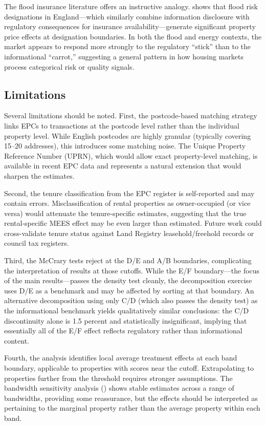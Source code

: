 \documentclass[12pt]{article}
\begin{document}
The flood insurance literature offers an instructive analogy. \citet{surminski2017flood} shows that flood risk designations in England---which similarly combine information disclosure with regulatory consequences for insurance availability---generate significant property price effects at designation boundaries. In both the flood and energy contexts, the market appears to respond more strongly to the regulatory ``stick'' than to the informational ``carrot,'' suggesting a general pattern in how housing markets process categorical risk or quality signals.

\subsection{Limitations}

Several limitations should be noted. First, the postcode-based matching strategy links EPCs to transactions at the postcode level rather than the individual property level. While English postcodes are highly granular (typically covering 15--20 addresses), this introduces some matching noise. The Unique Property Reference Number (UPRN), which would allow exact property-level matching, is available in recent EPC data and represents a natural extension that would sharpen the estimates.

Second, the tenure classification from the EPC register is self-reported and may contain errors. Misclassification of rental properties as owner-occupied (or vice versa) would attenuate the tenure-specific estimates, suggesting that the true rental-specific MEES effect may be even larger than estimated. Future work could cross-validate tenure status against Land Registry leasehold/freehold records or council tax registers.

Third, the McCrary tests reject at the D/E and A/B boundaries, complicating the interpretation of results at those cutoffs. While the E/F boundary---the focus of the main results---passes the density test cleanly, the decomposition exercise uses D/E as a benchmark and may be affected by sorting at that boundary. An alternative decomposition using only C/D (which also passes the density test) as the informational benchmark yields qualitatively similar conclusions: the C/D discontinuity alone is 1.5 percent and statistically insignificant, implying that essentially all of the E/F effect reflects regulatory rather than informational content.

Fourth, the analysis identifies local average treatment effects at each band boundary, applicable to properties with scores near the cutoff. Extrapolating to properties further from the threshold requires stronger assumptions. The bandwidth sensitivity analysis () shows stable estimates across a range of bandwidths, providing some reassurance, but the effects should be interpreted as pertaining to the marginal property rather than the average property within each band.
\end{document}
